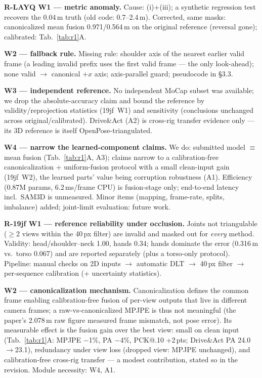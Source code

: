 \documentclass[10pt,twocolumn,letterpaper]{article}
\newcommand{\rpoint}[1]{\noindent\textbf{#1}\;}
\begin{document}
\rpoint{R-LAYQ W1 --- metric anomaly.}
Cause: (i)+(iii); a synthetic regression test recovers the 0.04\,m truth (old code: 0.7--2.4\,m). Corrected, same masks: canonicalized mean fusion 0.971/0.564\,m on the original reference (reversal gone); calibrated: Tab.~\ref{tab:r1}A.

\rpoint{W2 --- fallback rule.}
Missing rule: shoulder axis of the nearest earlier valid frame (a leading invalid prefix uses the first valid frame --- the only look-ahead); none valid $\to$ canonical $+x$ axis; axis-parallel guard; pseudocode in \S3.3.

\rpoint{W3 --- independent reference.}
No independent MoCap subset was available; we drop the absolute-accuracy claim and bound the reference by validity/reprojection statistics (19jf~W1) and sensitivity (conclusions unchanged across original/calibrated). Drive\&Act (A2) is cross-rig transfer evidence only --- its 3D reference is itself OpenPose-triangulated.

\rpoint{W4 --- narrow the learned-component claims.}
We do: submitted model $\equiv$ mean fusion (Tab.~\ref{tab:r1}A, A3); claims narrow to a calibration-free canonicalization + uniform-fusion protocol with a small clean-input gain (19jf~W2), the learned parts' value being corruption robustness (A1). Efficiency (0.87M params, 6.2\,ms/frame CPU) is fusion-stage only; end-to-end latency incl.\ SAM3D is unmeasured. Minor items (mapping, frame-rate, splits, imbalance) added; joint-limit evaluation: future work.

\rpoint{R-19jf W1 --- reference reliability under occlusion.}
Joints not triangulable ($\ge$2 views within the 40\,px filter) are invalid and masked out for \emph{every} method. Validity: head/shoulder--neck 1.00, hands 0.34; hands dominate the error (0.316\,m vs.\ torso 0.067) and are reported separately (plus a torso-only protocol). Pipeline: manual checks on 2D inputs $\to$ automatic DLT $\to$ 40\,px filter $\to$ per-sequence calibration (+ uncertainty statistics).

\rpoint{W2 --- canonicalization mechanism.}
Canonicalization defines the common frame enabling calibration-free fusion of per-view outputs that live in different camera frames; a raw-vs-canonicalized MPJPE is thus not meaningful (the paper's 2.078\,m raw figure measured frame mismatch, not pose error). Its measurable effect is the fusion gain over the best view: small on clean input (Tab.~\ref{tab:r1}A: MPJPE $-$1\%, PA $-$4\%, PCK@.10 +2\,pts; Drive\&Act PA 24.0$\to$23.1), redundancy under view loss (dropped view: MPJPE unchanged), and calibration-free cross-rig transfer --- a modest contribution, stated so in the revision. Module necessity: W4, A1.
\end{document}
